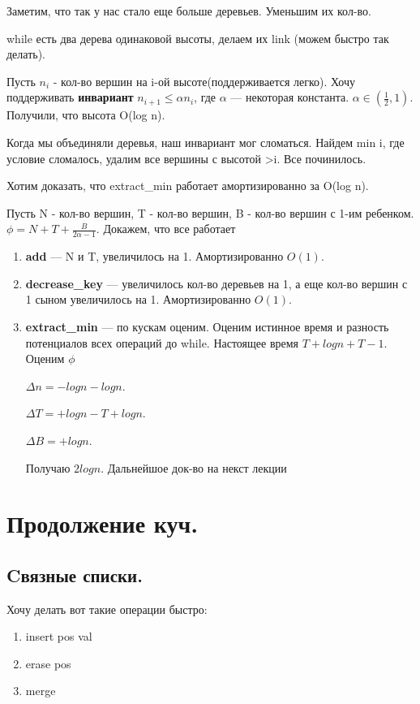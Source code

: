 \documentclass{article}
\begin{document}
Заметим, что так  у нас стало еще больше деревьев. Уменьшим их кол-во.

while есть два дерева одинаковой высоты, делаем их link (можем быстро так делать).

Пусть $n_i$ - кол-во вершин на i-ой высоте(поддерживается легко). Хочу поддерживать \textbf{инвариант} $n_{i+1}\leq \alpha n_i$, где $\alpha$ --- некоторая константа. $\alpha \in (\frac{1}{2},1)$. Получили, что высота O(log n).

Когда мы объединяли деревья, наш инвариант мог сломаться. Найдем min i, где условие сломалось, удалим все вершины с высотой >i.  Все починилось.


Хотим доказать, что extract\_min работает амортизированно за O(log n).

Пусть N - кол-во вершин, T - кол-во вершин, B - кол-во вершин с 1-им ребенком. $\phi = N+ T + \frac{B}{2\alpha-1}$. Докажем, что все работает

\begin{enumerate}
    \item[]  \textbf{add} --- N и T, увеличилось на 1. Амортизированно $O(1)$.
    \item[] \textbf{decrease\_key} --- увеличилось кол-во деревьев на 1, а еще кол-во вершин с 1 сыном увеличилось на 1.  Амортизированно $O(1)$.
    \item[] \textbf{extract\_min} --- по кускам оценим. Оценим истинное время и разность потенциалов всех операций до while. Настоящее время $T + log n + T-1$. Оценим $\phi$
    
    $\Delta n = -log n -log n$.
    
    $\Delta T =  +log n - T + log n$.
    
    $\Delta B = +log n$.

    Получаю $2log n$.  Дальнейшое док-во на некст лекции
\end{enumerate}

\pagebreak

\section{Продолжение куч.}
\subsection*{Cвязные списки.}

Хочу делать вот такие операции быстро:
\begin{enumerate}
    \item insert pos val
    \item erase  pos
    \item merge 
\end{enumerate}
\end{document}
